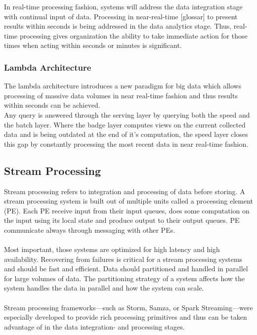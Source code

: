 In real-time processing fashion, systems will address the data integration stage
with continual input of data. Processing in near-real-time [glossar] to present 
results within seconds is being addressed in the data analytics stage. Thus,
real-time processing gives organization the ability to take immediate action
for those times when acting within seconds or minutes is significant.
\cite{PrpSvyOfDSPS}

\subsubsection{Lambda Architecture}
The lambda architecture introduces a new paradigm for big data which allows
processing of massive data volumes in near real-time fashion and thus results within
seconds can be achieved. 
\\
Any query is answered through the serving layer by querying 
both the speed and the batch layer. Where the badge layer computes views on the current collected data and
is being outdated at the end of it's computation, the speed layer closes this 
gap by constantly processing the most recent data in near real-time fashion. 


\cite{marz2015big} \cite{PrpSvyOfDSPS}

\subsection{Stream Processing}
\label{intro-datastream-streamprocessing}
Stream processing refers to integration and processing of data before storing. 
A stream processing system is built out of multiple units called a processing
element (PE). Each PE receive input from their input queues, does some
computation on the input using its local state and produce output to their
output queues. PE communicate always through messaging with other PEs. 
\\ \\
Most important, those systems are optimized for high latency and high
availability. Recovering from failures is critical for a stream processing
systems and should be fast and efficient. 
Data should partitioned and handled in parallel for large volumes of data. 
The partitioning strategy of a system  affects how the system
handles the data in parallel and how the system can scale. 
\cite{PrpSvyOfDSPS}
\\ \\
Stream processing frameworks---such as Storm, Samza, or Spark
Streaming---were especially developed to provide rich processing primitives and thus can be taken advantage of
in the data integration- and processing stages.

